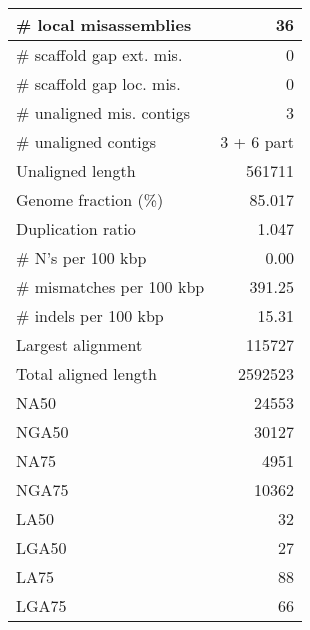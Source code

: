 \documentclass[12pt,a4paper]{article}
\begin{document}
\begin{table}[ht]
\begin{center}
\begin{tabular}{|l*{1}{|r}|}
\# local misassemblies & 36 \\ \hline
\# scaffold gap ext. mis. & 0 \\ \hline
\# scaffold gap loc. mis. & 0 \\ \hline
\# unaligned mis. contigs & 3 \\ \hline
\# unaligned contigs & 3 + 6 part \\ \hline
Unaligned length & 561711 \\ \hline
Genome fraction (\%) & 85.017 \\ \hline
Duplication ratio & 1.047 \\ \hline
\# N's per 100 kbp & 0.00 \\ \hline
\# mismatches per 100 kbp & 391.25 \\ \hline
\# indels per 100 kbp & 15.31 \\ \hline
Largest alignment & 115727 \\ \hline
Total aligned length & 2592523 \\ \hline
NA50 & 24553 \\ \hline
NGA50 & 30127 \\ \hline
NA75 & 4951 \\ \hline
NGA75 & 10362 \\ \hline
LA50 & 32 \\ \hline
LGA50 & 27 \\ \hline
LA75 & 88 \\ \hline
LGA75 & 66 \\ \hline
\end{tabular}
\end{center}
\end{table}
\end{document}
